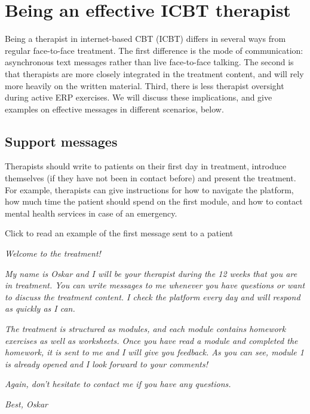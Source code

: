 \documentclass[]{book}
\theoremstyle{definition}
\theoremstyle{definition}
\theoremstyle{definition}
\theoremstyle{remark}
\begin{document}
\hypertarget{being-an-effective-icbt-therapist}{%
\chapter{Being an effective ICBT
therapist}\label{being-an-effective-icbt-therapist}}

Being a therapist in internet-based CBT (ICBT) differs in several ways
from regular face-to-face treatment. The first difference is the mode of
communication: asynchronous text messages rather than live face-to-face
talking. The second is that therapists are more closely integrated in
the treatment content, and will rely more heavily on the written
material. Third, there is less therapist oversight during active ERP
exercises. We will discuss these implications, and give examples on
effective messages in different scenarios, below.

\hypertarget{support-messages}{%
\section{Support messages}\label{support-messages}}

Therapists should write to patients on their first day in treatment,
introduce themselves (if they have not been in contact before) and
present the treatment. For example, therapists can give instructions for
how to navigate the platform, how much time the patient should spend on
the first module, and how to contact mental health services in case of
an emergency.

 Click to read an example of the first message sent to a patient

\emph{Welcome to the treatment!}

\emph{My name is Oskar and I will be your therapist during the 12 weeks
that you are in treatment. You can write messages to me whenever you
have questions or want to discuss the treatment content. I check the
platform every day and will respond as quickly as I can.}

\emph{The treatment is structured as modules, and each module contains
homework exercises as well as worksheets. Once you have read a module
and completed the homework, it is sent to me and I will give you
feedback. As you can see, module 1 is already opened and I look forward
to your comments!}

\emph{Again, don't hesitate to contact me if you have any questions.}

\emph{Best, Oskar}
\end{document}
